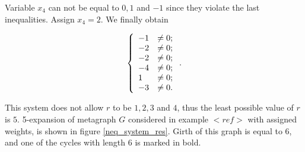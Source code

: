 \documentclass[14pt]{mmcs-article}
\begin{document}
Variable $x_4$ can not be equal to $0, 1$ and $-1$ since they violate the last inequalities. Assign $x_4 = 2$. We finally obtain

\begin{equation}
    \centering
    \left\{
        \begin{array}{ll}
            - 1 &\neq 0   ; \\
            - 2 &\neq 0   ; \\
            - 2 &\neq 0   ; \\
            - 4 &\neq 0   ; \\
              1 &\neq 0   ; \\
            - 3 &\neq 0   . \\
        \end{array}
    \right..
    \label{eqs:cycle_search_neqs_4}
\end{equation}


This system does not allow $r$ to be $1, 2, 3$ and $4$, thus the least possible value of $r$ is $5$. 5-expansion of metagraph $G$ considered in example $<ref>$ with assigned weights, is shown in figure \ref{neq_system_res}. Girth of this graph is equal to $6$, and one of the cycles with length $6$ is marked in bold.
\end{document}
